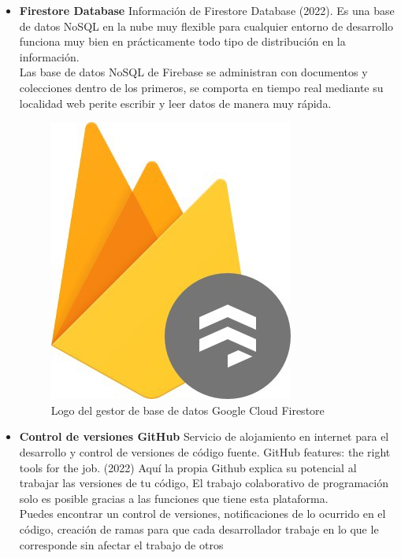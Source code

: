 \documentclass[12pt]{book}
\begin{document}
\begin{enumerate}
\begin{itemize}
    		\item \textbf{Firestore Database}
    		Información de Firestore Database (2022). Es una base de datos NoSQL en la nube muy flexible para cualquier entorno de desarrollo funciona muy bien en prácticamente todo tipo de distribución en la información. \\
    		Las base de datos NoSQL de Firebase se administran con documentos y colecciones dentro de los primeros, se comporta en tiempo real mediante su localidad web perite escribir y leer datos de manera muy rápida. 
    		
    		\begin{figure} [h]
    			\centering
    			\includegraphics[scale=0.25]{./src/mt2}
    			\caption{Logo del gestor de base de datos Google Cloud Firestore}
    			\label{fig:mt2}
  
    		\end{figure} 
    
    	\item \textbf{Control de versiones GitHub}
    	Servicio de alojamiento en internet para el desarrollo y control de versiones de código fuente. 
    	GitHub features: the right tools for the job. (2022)  Aquí la propia Github explica su potencial al trabajar las versiones de tu código, El trabajo colaborativo de programación solo es posible gracias a las funciones que tiene esta plataforma.\\
    	Puedes encontrar un control de versiones, notificaciones de lo ocurrido en el código, creación de ramas para que cada desarrollador trabaje en lo que le corresponde sin afectar el trabajo de otros
    	

\end{itemize}
\end{enumerate}
\end{document}
